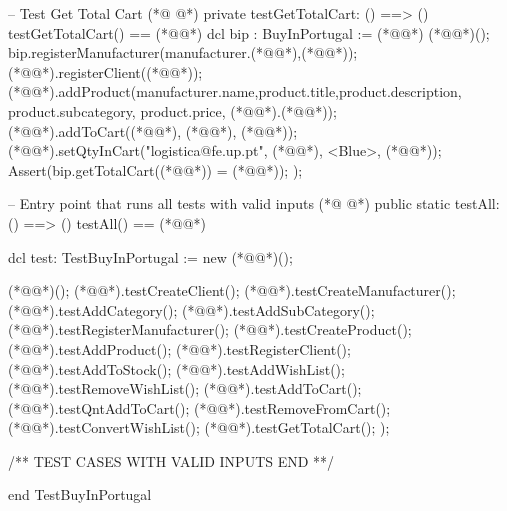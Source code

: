 \begin{vdmpp}[breaklines=true]
 -- Test Get Total Cart
(*@
\label{testGetTotalCart:332}
@*)
 private testGetTotalCart: () ==> ()
 testGetTotalCart() == (*@\vdmnotcovered{(}@*)
  dcl bip : BuyInPortugal := (*@@*) (*@@*)();
  bip.registerManufacturer(manufacturer.(*@@*),(*@@*));
  (*@@*).registerClient((*@@*));
  (*@@*).addProduct(manufacturer.name,product.title,product.description, product.subcategory, product.price, (*@@*).(*@@*));
  (*@@*).addToCart((*@@*), (*@@*), (*@@*));
  (*@@*).setQtyInCart("logistica@fe.up.pt", (*@@*), <Blue>, (*@@*));
  Assert(bip.getTotalCart((*@@*)) = (*@@*));
 );
 
 
 -- Entry point that runs all tests with valid inputs
(*@
\label{testAll:345}
@*)
  public static testAll: () ==> ()
  testAll() == (*@\vdmnotcovered{(}@*)
   
    dcl test: TestBuyInPortugal := new (*@@*)();
     
    (*@@*)();
    (*@@*).testCreateClient();
    (*@@*).testCreateManufacturer();
    (*@@*).testAddCategory();
    (*@@*).testAddSubCategory();
    (*@@*).testRegisterManufacturer();
    (*@@*).testCreateProduct();
    (*@@*).testAddProduct();
    (*@@*).testRegisterClient();
    (*@@*).testAddToStock();
    (*@@*).testAddWishList();
    (*@@*).testRemoveWishList();
    (*@@*).testAddToCart();
    (*@@*).testQntAddToCart();
    (*@@*).testRemoveFromCart();
    (*@@*).testConvertWishList();
    (*@@*).testGetTotalCart();
  );
  
 
 /** TEST CASES WITH VALID INPUTS END **/

end TestBuyInPortugal
\end{vdmpp}
\bigskip
